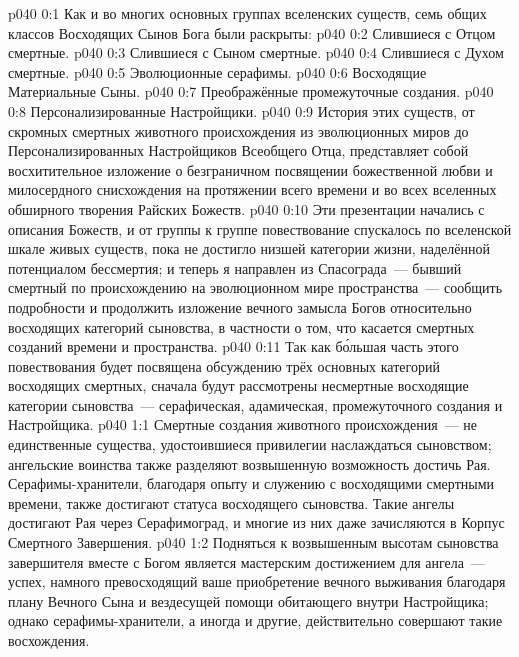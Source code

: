 \author{Могущественный Посланник}
\vs p040 0:1 Как и во многих основных группах вселенских существ, семь общих классов Восходящих Сынов Бога были раскрыты:
\vs p040 0:2 Слившиеся с Отцом смертные.
\vs p040 0:3 Слившиеся с Сыном смертные.
\vs p040 0:4 Слившиеся с Духом смертные.
\vs p040 0:5 Эволюционные серафимы.
\vs p040 0:6 Восходящие Материальные Сыны.
\vs p040 0:7 Преображённые промежуточные создания.
\vs p040 0:8 Персонализированные Настройщики.
\vs p040 0:9 \pc История этих существ, от скромных смертных животного происхождения из эволюционных миров до Персонализированных Настройщиков Всеобщего Отца, представляет собой восхитительное изложение о безграничном посвящении божественной любви и милосердного снисхождения на протяжении всего времени и во всех вселенных обширного творения Райских Божеств.
\vs p040 0:10 Эти презентации начались с описания Божеств, и от группы к группе повествование спускалось по вселенской шкале живых существ, пока не достигло низшей категории жизни, наделённой потенциалом бессмертия; и теперь я направлен из Спасограда~--- бывший смертный по происхождению на эволюционном мире пространства~--- сообщить подробности и продолжить изложение вечного замысла Богов относительно восходящих категорий сыновства, в частности о том, что касается смертных созданий времени и пространства.
\vs p040 0:11 Так как б\'ольшая часть этого повествования будет посвящена обсуждению трёх основных категорий восходящих смертных, сначала будут рассмотрены несмертные восходящие категории сыновства~--- серафическая, адамическая, промежуточного создания и Настройщика.
\vs p040 1:1 Смертные создания животного происхождения~--- не единственные существа, удостоившиеся привилегии наслаждаться сыновством; ангельские воинства также разделяют возвышенную возможность достичь Рая. Серафимы\hyp{}хранители, благодаря опыту и служению с восходящими смертными времени, также достигают статуса восходящего сыновства. Такие ангелы достигают Рая через Серафимоград, и многие из них даже зачисляются в Корпус Смертного Завершения.
\vs p040 1:2 Подняться к возвышенным высотам сыновства завершителя вместе с Богом является мастерским достижением для ангела~--- успех, намного превосходящий ваше приобретение вечного выживания благодаря плану Вечного Сына и вездесущей помощи обитающего внутри Настройщика; однако серафимы\hyp{}хранители, а иногда и другие, действительно совершают такие восхождения.
